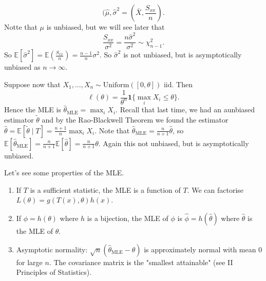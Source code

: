 \documentclass{article}
\begin{document}
\[
	(\hat \mu , \hat{\sigma}^2 = (\bar X, \frac{S_{xx}}n).
\]
Notte that $ \mu $ is unbiased, but we will see later that
\[
	\frac{S_{xx}}{\sigma^2} = \frac{n\hat\sigma^2}{\sigma^2} \sim \chi_{n-1}^2.
\]
So $ \mathbb E[\hat\sigma^2] = \mathbb E\left(\frac{S_{xx}}n\right) = \frac {n-1}n \sigma^2 $. So $ \hat\sigma^2 $ is not unbiased, but is asymptotically unbiased as $ n\to\infty $.\par
Suppose now that $ X_1,\dots, X_n\sim \text{Uniform}([0,\theta]) $ iid. Then
\[
	\ell(\theta) = \frac 1{\theta^n} \mathbf 1\{\max_i X_i\le \theta\}.
\]
Hence the MLE is $ \hat\theta_{\text{MLE}} = \max_i X_i $. Recall that last time, we had an aunbiased estimator $ \tilde\theta $ and by the Rao-Blackwell Theorem we found the estimator $ \hat\theta = \mathbb E[ \tilde\theta\mid T] = \frac{n+1}n \max_i X_i $. Note that $ \hat\theta_{\text{MLE}} =\frac{n}{n+1} \hat \theta	$, so $ \mathbb E[\hat \theta_{\text{MLE}}] = \frac{n}{n+1} \mathbb E[\hat\theta] = \frac{n}{n+1} \theta $. Again this not unbiased, but is asymptotically unbiased.
\par 
Let's see some properties of the MLE.
\begin{enumerate}
	\item If $ T $ is a sufficient statistic, the MLE is a function of $ T $. We can factorise $ L(\theta) = g(T(x),\theta)h(x) $. 
	\item If $ \phi = h(\theta) $ where $ h $ is a bijection, the MLE of $ \phi $ is $ \hat\phi = h(\hat\theta) $ where $ \hat\theta $ is the MLE of $ \theta $.
	\item Asymptotic normality: $ \sqrt n (\hat\theta_{\text{MLE}} -\theta) $ is approximately normal with mean $ 0 $ for large $ n $. The covariance matrix is the "smallest attainable" (see II Principles of Statistics).
\end{enumerate}
\end{document}
